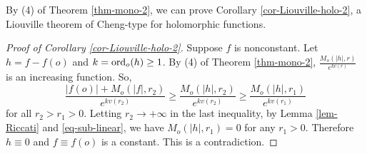 \documentclass[12pt]{amsart}
\theoremstyle{definition}
\theoremstyle{remark}
\numberwithin{equation}{section}
\def\ord{{\rm ord}}
\begin{document}
By (4) of Theorem \ref{thm-mono-2}, we can prove Corollary \ref{cor-Liouville-holo-2}, a Liouville theorem of Cheng-type for holomorphic functions.
\begin{proof}[Proof of Corollary \ref{cor-Liouville-holo-2}]
Suppose $f$ is nonconstant. Let $h=f-f(o)$ and $k=\ord_o(h)\geq 1$. By (4) of Theorem \ref{thm-mono-2}, $\frac{M_o(|h|,r)}{e^{kv(r)}}$ is an increasing function. So,
\begin{equation}
\frac{|f(o)|+M_o(|f|,r_2)}{e^{kv(r_2)}}\geq\frac{M_o(|h|,r_2)}{e^{kv(r_2)}}\geq\frac{ M_o(|h|,r_1)}{e^{kv(r_1)}}
\end{equation}
for all $r_2>r_1>0$. Letting $r_2\to+\infty$ in the last inequality, by Lemma \ref{lem-Riccati} and \eqref{eq-sub-linear}, we have $M_o(|h|,r_1)=0$ for any $r_1>0$. Therefore $h\equiv0$ and $f\equiv f(o)$ is a constant. This is a contradiction.
\end{proof}
\end{document}
